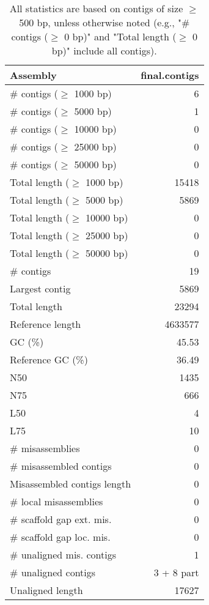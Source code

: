 \documentclass[12pt,a4paper]{article}
\begin{document}
\begin{table}[ht]
\begin{center}
\caption{All statistics are based on contigs of size $\geq$ 500 bp, unless otherwise noted (e.g., "\# contigs ($\geq$ 0 bp)" and "Total length ($\geq$ 0 bp)" include all contigs).}
\begin{tabular}{|l*{1}{|r}|}
\hline
Assembly & final.contigs \\ \hline
\# contigs ($\geq$ 1000 bp) & 6 \\ \hline
\# contigs ($\geq$ 5000 bp) & 1 \\ \hline
\# contigs ($\geq$ 10000 bp) & 0 \\ \hline
\# contigs ($\geq$ 25000 bp) & 0 \\ \hline
\# contigs ($\geq$ 50000 bp) & 0 \\ \hline
Total length ($\geq$ 1000 bp) & 15418 \\ \hline
Total length ($\geq$ 5000 bp) & 5869 \\ \hline
Total length ($\geq$ 10000 bp) & 0 \\ \hline
Total length ($\geq$ 25000 bp) & 0 \\ \hline
Total length ($\geq$ 50000 bp) & 0 \\ \hline
\# contigs & 19 \\ \hline
Largest contig & 5869 \\ \hline
Total length & 23294 \\ \hline
Reference length & 4633577 \\ \hline
GC (\%) & 45.53 \\ \hline
Reference GC (\%) & 36.49 \\ \hline
N50 & 1435 \\ \hline
N75 & 666 \\ \hline
L50 & 4 \\ \hline
L75 & 10 \\ \hline
\# misassemblies & 0 \\ \hline
\# misassembled contigs & 0 \\ \hline
Misassembled contigs length & 0 \\ \hline
\# local misassemblies & 0 \\ \hline
\# scaffold gap ext. mis. & 0 \\ \hline
\# scaffold gap loc. mis. & 0 \\ \hline
\# unaligned mis. contigs & 1 \\ \hline
\# unaligned contigs & 3 + 8 part \\ \hline
Unaligned length & 17627 \\ \hline

\end{tabular}
\end{center}
\end{table}
\end{document}
